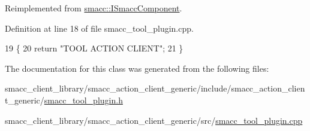 Reimplemented from \hyperlink{classsmacc_1_1ISmaccComponent_aa314809a7fd3516461e31cc120d0cfe7}{smacc\+::\+I\+Smacc\+Component}.



Definition at line 18 of file smacc\+\_\+tool\+\_\+plugin.\+cpp.


\begin{DoxyCode}
19 \{
20     \textcolor{keywordflow}{return} \textcolor{stringliteral}{"TOOL ACTION CLIENT"};
21 \}
\end{DoxyCode}


The documentation for this class was generated from the following files\+:\begin{DoxyCompactItemize}
\item 
smacc\+\_\+client\+\_\+library/smacc\+\_\+action\+\_\+client\+\_\+generic/include/smacc\+\_\+action\+\_\+client\+\_\+generic/\hyperlink{smacc__tool__plugin_8h}{smacc\+\_\+tool\+\_\+plugin.\+h}\item 
smacc\+\_\+client\+\_\+library/smacc\+\_\+action\+\_\+client\+\_\+generic/src/\hyperlink{smacc__tool__plugin_8cpp}{smacc\+\_\+tool\+\_\+plugin.\+cpp}\end{DoxyCompactItemize}
